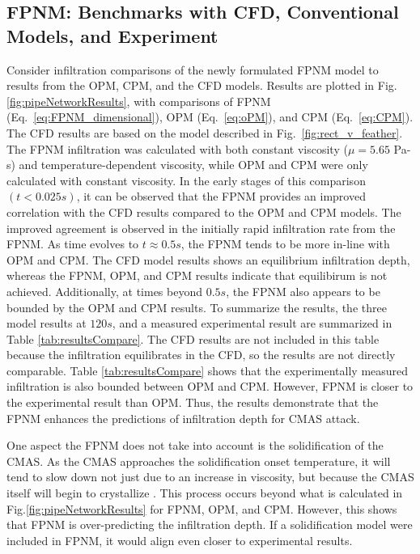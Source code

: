 \documentclass[%
 aip,
 amsmath,amssymb,
 reprint,%
]{revtex4-1}
\begin{document}

\subsection{FPNM: Benchmarks with CFD, Conventional Models, and Experiment}
Consider infiltration comparisons of the newly formulated FPNM model to results from the OPM, CPM, and the CFD models. 
Results are plotted in Fig. \ref{fig:pipeNetworkResults}, with comparisons of FPNM (Eq.~\ref{eq:FPNM_dimensional}), OPM (Eq.~\ref{eq:oPM}), and CPM (Eq.~\ref{eq:CPM}). The CFD results are based on the model described in Fig.~\ref{fig:rect_v_feather}. 
The FPNM infiltration was calculated with both constant viscosity ($\mu = 5.65$ Pa-s) and temperature-dependent viscosity, while OPM and CPM were only calculated with constant viscosity.
In the early stages of this comparison $(t<0.025s)$, it can be observed that the FPNM provides an improved correlation with the CFD results compared to the OPM and CPM models. The improved agreement is observed in the initially rapid infiltration rate from the FPNM. 
As time evolves to $t\approx0.5s$, the FPNM tends to be more in-line with OPM and CPM. The CFD model results shows an equilibrium infiltration depth, whereas the FPNM, OPM, and CPM results indicate that equilibirum is not achieved. 
Additionally, at times beyond $0.5s$, the FPNM also appears to be bounded by the OPM and CPM results. 
To summarize the results, the three model results at $120 s$, and a measured experimental result are summarized in Table \ref{tab:resultsCompare}. The CFD results are not included in this table because the infiltration equilibrates in the CFD, so the results are not directly comparable.
Table \ref{tab:resultsCompare} shows that the experimentally measured infiltration is also bounded between OPM and CPM.
However, FPNM is closer to the experimental result than OPM. 
Thus, the results demonstrate that the FPNM enhances the predictions of infiltration depth for CMAS attack.

One aspect the FPNM does not take into account is the solidification of the CMAS. As the CMAS approaches the solidification onset temperature, it will tend to slow down not just due to an increase in viscosity, but because the CMAS itself will begin to crystallize \cite{Naraparaju2019}. This process occurs beyond what is calculated in Fig.\ref{fig:pipeNetworkResults} for FPNM, OPM, and CPM. However, this shows that FPNM is over-predicting the infiltration depth. If a solidification model were included in FPNM, it would align even closer to experimental results.
\end{document}
